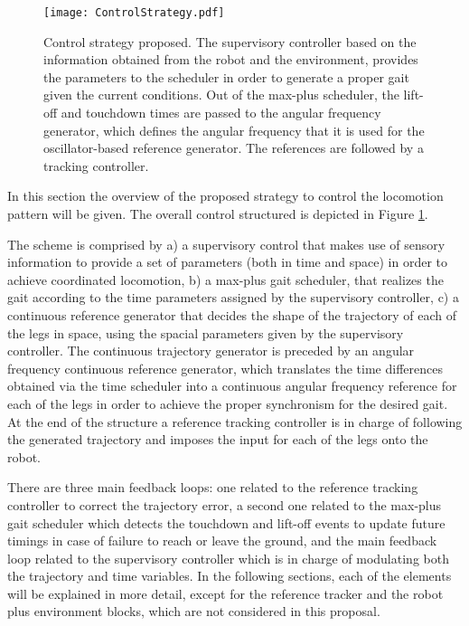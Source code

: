 \documentclass[main.tex]{subfiles}
\begin{document}
\begin{figure}[b]\centering
		\texttt{[image: ControlStrategy.pdf]}
		\caption{Control strategy proposed. The supervisory controller based on the information obtained from the robot and the environment, provides the parameters to the scheduler in order to generate a proper gait given the current conditions. Out of the max-plus scheduler, the lift-off and touchdown times are passed to the angular frequency generator, which defines the angular frequency that it is used for the oscillator-based reference generator. The references are followed by a tracking controller.
			\label{fig:ControlStrat} }
\end{figure}
In this section the overview of the proposed strategy to control the locomotion pattern will be given. The overall control structured is depicted in Figure \ref{fig:ControlStrat}. 

The scheme is comprised by a) a supervisory control that makes use of sensory information to provide a set of parameters (both in time and space) in order to achieve coordinated locomotion, b) a max-plus gait scheduler, that realizes the gait according to the time parameters assigned by the supervisory controller, c) a continuous reference generator that decides the shape of the trajectory of each of the legs in space, using the spacial parameters given by the supervisory controller. The continuous trajectory generator is preceded by an angular frequency continuous reference generator, which translates the time differences obtained via the time scheduler into a continuous angular frequency reference for each of the legs in order to achieve the proper synchronism for the desired gait. At the end of the structure a reference tracking controller is in charge of following the generated trajectory and imposes the input for each of the legs onto the robot. 

There are three main feedback loops: one related to the reference tracking controller to correct the trajectory error, a second one related to the max-plus gait scheduler which detects the touchdown and lift-off events to update future timings in case of failure to reach or leave the ground, and the main feedback loop related to the supervisory controller which is in charge of modulating both the trajectory and time variables. In the following sections, each of the elements will be explained in more detail, except for the reference tracker and the robot plus environment blocks, which are not considered in this proposal.
\end{document}
